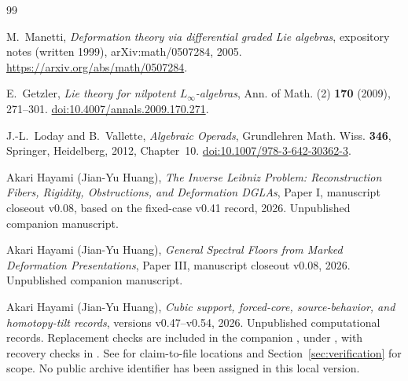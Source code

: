 \documentclass[11pt]{amsart}
\begin{document}
\clearpage
\begin{thebibliography}{99}
\raggedright

M.~Manetti,
\emph{Deformation theory via differential graded Lie algebras},
expository notes (written 1999), arXiv:math/0507284, 2005.
\url{https://arxiv.org/abs/math/0507284}.

E.~Getzler,
\emph{Lie theory for nilpotent $L_\infty$-algebras},
Ann. of Math. (2) \textbf{170} (2009), 271--301.
\href{https://doi.org/10.4007/annals.2009.170.271}{doi:10.4007/annals.2009.170.271}.

J.-L.~Loday and B.~Vallette,
\emph{Algebraic Operads}, Grundlehren Math. Wiss. \textbf{346},
Springer, Heidelberg, 2012, Chapter~10.
\href{https://doi.org/10.1007/978-3-642-30362-3}{doi:10.1007/978-3-642-30362-3}.

Akari Hayami (Jian-Yu Huang),
\emph{The Inverse Leibniz Problem: Reconstruction Fibers, Rigidity, Obstructions, and Deformation DGLAs},
Paper I, manuscript closeout v0.08, based on the fixed-case v0.41 record, 2026.
Unpublished companion manuscript.

Akari Hayami (Jian-Yu Huang),
\emph{General Spectral Floors from Marked Deformation Presentations},
Paper III, manuscript closeout v0.08, 2026. Unpublished companion manuscript.

Akari Hayami (Jian-Yu Huang),
\emph{Cubic support, forced-core, source-behavior, and homotopy-tilt records},
versions v0.47--v0.54, 2026. Unpublished computational records.
Replacement checks are included in the companion
, under
, with recovery checks in
.
See  for claim-to-file locations and
Section~\ref{sec:verification} for scope. No public archive identifier
has been assigned in this local version.
\end{thebibliography}
\end{document}
